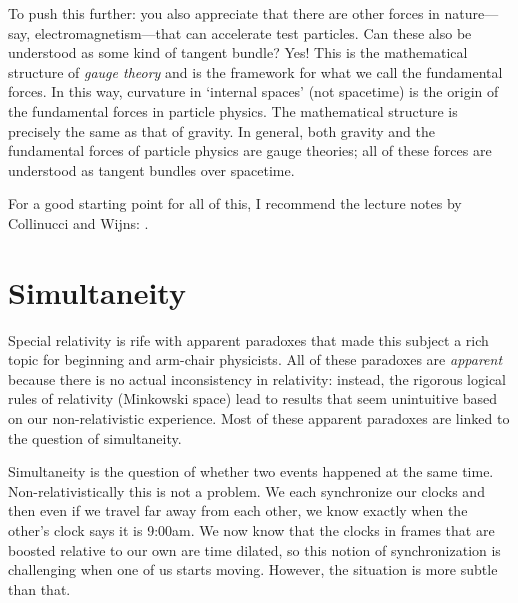 \documentclass[12pt, oneside]{report}    %
\let\oldsection\section
\def\section{%
  \setcounter{sidenote}{1}%
  \oldsection
}
\begin{document}
\begin{example}
To push this further: you also appreciate that there are other forces in nature---say, electromagnetism---that can accelerate test particles. Can these also be understood as some kind of tangent bundle? Yes! This is the mathematical structure of \emph{gauge theory} and is the framework for what we call the fundamental forces. In this way, curvature in `internal spaces' (not spacetime) is the origin of the fundamental forces in particle physics. The mathematical structure is precisely the same as that of gravity. In general, both gravity and the fundamental forces of particle physics are gauge theories; all of these forces are understood as tangent bundles over spacetime. 

For a good starting point for all of this, I recommend the lecture notes by Collinucci and Wijns: \cite{Collinucci:2006hx}.
\end{example}

\section{Simultaneity}

Special relativity is rife with apparent paradoxes that made this subject a rich topic for beginning and arm-chair physicists. All of these paradoxes are \emph{apparent} because there is no actual inconsistency in relativity: instead, the rigorous logical rules of relativity (Minkowski space) lead to results that seem unintuitive based on our non-relativistic experience. Most of these apparent paradoxes are linked to the question of simultaneity. 

Simultaneity is the question of whether two events happened at the same time. Non-relativistically this is not a problem. We each synchronize our clocks and then even if we travel far away from each other, we know exactly when the other's clock says it is 9:00am. We now know that the clocks in frames that are boosted relative to our own are time dilated, so this notion of synchronization is challenging when one of us starts moving. However, the situation is more subtle than that. 
\end{document}
